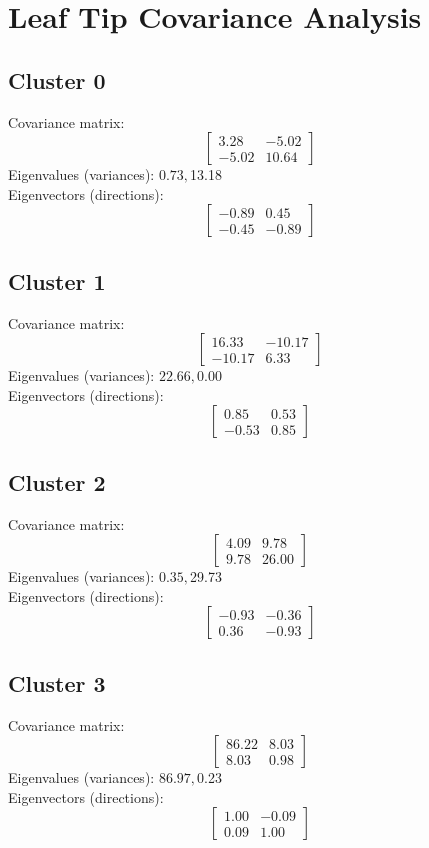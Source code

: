 \documentclass{article}
\begin{document}
\section*{Leaf Tip Covariance Analysis}
\subsection*{Cluster 0}
Covariance matrix:
\[\begin{bmatrix}3.28 & -5.02 \\-5.02 & 10.64\end{bmatrix}\]
Eigenvalues (variances): $ 0.73, $13.18\\
Eigenvectors (directions):
\[\begin{bmatrix}-0.89 & 0.45 \\-0.45 & -0.89\end{bmatrix}\]
\subsection*{Cluster 1}
Covariance matrix:
\[\begin{bmatrix}16.33 & -10.17 \\-10.17 & 6.33\end{bmatrix}\]
Eigenvalues (variances): $ 22.66, $0.00\\
Eigenvectors (directions):
\[\begin{bmatrix}0.85 & 0.53 \\-0.53 & 0.85\end{bmatrix}\]
\subsection*{Cluster 2}
Covariance matrix:
\[\begin{bmatrix}4.09 & 9.78 \\9.78 & 26.00\end{bmatrix}\]
Eigenvalues (variances): $ 0.35, $29.73\\
Eigenvectors (directions):
\[\begin{bmatrix}-0.93 & -0.36 \\0.36 & -0.93\end{bmatrix}\]
\subsection*{Cluster 3}
Covariance matrix:
\[\begin{bmatrix}86.22 & 8.03 \\8.03 & 0.98\end{bmatrix}\]
Eigenvalues (variances): $ 86.97, $0.23\\
Eigenvectors (directions):
\[\begin{bmatrix}1.00 & -0.09 \\0.09 & 1.00\end{bmatrix}\]
\end{document}
